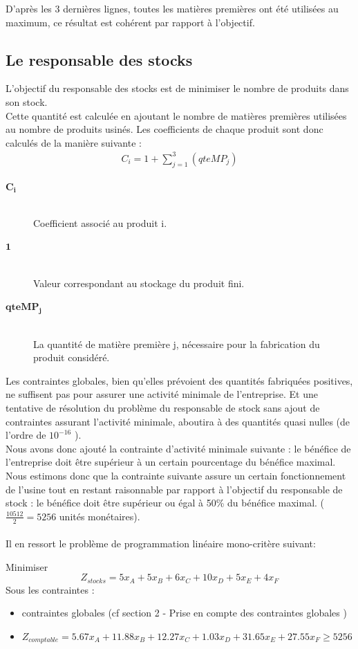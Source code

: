 \documentclass[12pt]{article}
\begin{document}
D'après les 3 dernières lignes, toutes les matières premières ont été utilisées au maximum, ce résultat est cohérent par rapport à l'objectif.
\subsection{Le responsable des stocks}
L'objectif du responsable des stocks est de minimiser le nombre de produits dans son stock. \\
Cette quantité est calculée en ajoutant le nombre de matières premières utilisées au nombre de produits usinés. Les coefficients de chaque produit sont donc calculés de la manière suivante : 
\begin{align*} C_{i} = 1 +  \sum_{j=1}^{3}(qteMP_{j}) 
\end{align*}
\begin{description}
\item[$\mathbf{C_{i}}$]\hfill\\Coefficient associé au produit i.
\item[$\mathbf{1}$]\hfill\\ Valeur correspondant au stockage du produit fini.
\item[$\mathbf{qteMP_{j}}$]\hfill\\La quantité de matière première j, nécessaire pour la fabrication du produit considéré.
\end{description}
Les contraintes globales, bien qu'elles prévoient des quantités fabriquées positives, ne suffisent pas pour assurer une activité minimale de l'entreprise. Et une tentative de résolution du problème du responsable de stock sans ajout de contraintes assurant l'activité minimale, aboutira à des quantités quasi nulles (de l'ordre de $ 10 ^{-16}$ ).\\
Nous avons donc ajouté la contrainte d'activité minimale suivante : le bénéfice de l'entreprise doit être supérieur à un certain pourcentage du bénéfice maximal.\\
Nous estimons donc que la contrainte suivante assure un certain fonctionnement de l'usine tout en restant raisonnable par rapport à l'objectif du responsable de stock : le bénéfice doit être supérieur ou égal à 50\% du bénéfice maximal. ($\frac{10512}{2} = 5256$ unités monétaires).\\
\\
Il en ressort le problème de programmation linéaire mono-critère suivant:
\begin{tcolorbox}
Minimiser
\begin{equation*}
 Z_{stocks}= 5x_{A} + 5x_{B} + 6x_{C} + 10x_{D} + 5x_{E} + 4x_{F}
\end{equation*}
Sous les contraintes :
\begin{itemize}
\item contraintes globales (cf section 2 - Prise en compte des contraintes globales )
\item $Z_{comptable}= 5.67x_{A} +11.88x_{B} +12.27x_{C} +1.03x_{D} +31.65x_{E} +27.55x_{F} \geq 5256$
\end{itemize}
\end{tcolorbox}
\end{document}
